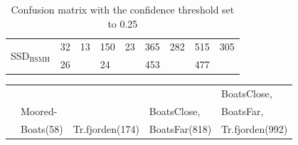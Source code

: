 \begin{table}[h!]
\begin{tabular}{l|ll|ll|ll|ll}
\multirow{2}{*}{SSD$_{\text{BSMH}}$}  & 32            & 13           & 150            & 23            & 365            & 282            & 515              & 305             \\
                       & 26            &              & 24             &               & 453            &                & 477              &                
\end{tabular}
\caption{Confusion matrix with the confidence threshold set to 0.25}
\label{tab:conf_025}
\end{table}


\begin{table}[h!]
\centering
\begin{tabular}{l|ll|ll|ll|ll}
                       & \multicolumn{2}{l|}{} & \multicolumn{2}{l|}{} & \multicolumn{2}{l|}{} & \multicolumn{2}{l}{BoatsClose,} \\ 
                       
                       & \multicolumn{2}{l|}{Moored-} & \multicolumn{2}{l|}{} & \multicolumn{2}{l|}{BoatsClose,} & \multicolumn{2}{l}{BoatsFar,} \\ 

                       & \multicolumn{2}{l|}{Boats(58)} & \multicolumn{2}{l|}{Tr.fjorden(174)} & \multicolumn{2}{l|}{BoatsFar(818)} & \multicolumn{2}{l}{Tr.fjorden(992)} \\
                       

\end{tabular}
\end{table}
